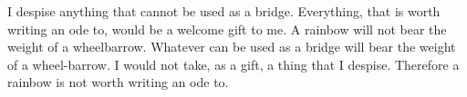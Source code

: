 \begin{exercises}





\item \label{itm:rainbow} I despise anything that cannot be used as a bridge. Everything, that is worth writing an ode to, would be a welcome gift to me. A rainbow will not bear the weight of a wheelbarrow.  Whatever can be used as a bridge will bear the weight of a wheel-barrow. I would not take, as a gift, a thing that I despise. Therefore a rainbow is not worth writing an ode to. 

\end{exercises}

